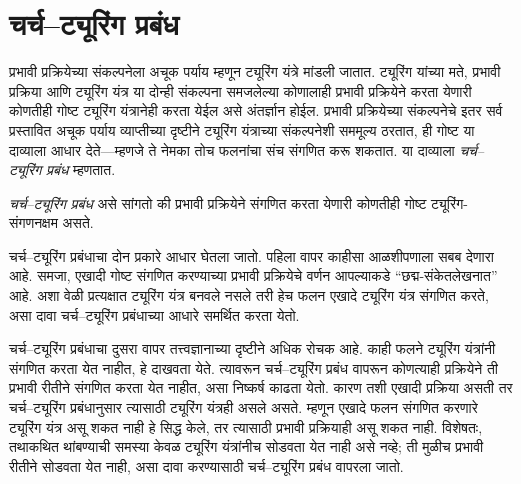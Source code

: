 \section{चर्च--ट्यूरिंग प्रबंध}\label{tur:mac:ctt:sec}

प्रभावी प्रक्रियेच्या संकल्पनेला अचूक पर्याय म्हणून ट्यूरिंग
यंत्रे मांडली जातात. ट्यूरिंग यांच्या मते, प्रभावी प्रक्रिया आणि
ट्यूरिंग यंत्र या दोन्ही संकल्पना समजलेल्या कोणालाही प्रभावी
प्रक्रियेने करता येणारी कोणतीही गोष्ट ट्यूरिंग यंत्रानेही करता
येईल असे अंतर्ज्ञान होईल. प्रभावी प्रक्रियेच्या संकल्पनेचे
इतर सर्व प्रस्तावित अचूक पर्याय व्याप्तीच्या दृष्टीने ट्यूरिंग
यंत्राच्या संकल्पनेशी सममूल्य ठरतात, ही गोष्ट या दाव्याला
आधार देते---म्हणजे ते नेमका तोच फलनांचा संच संगणित करू
शकतात. या दाव्याला \emph{चर्च--ट्यूरिंग प्रबंध} म्हणतात.

\begin{defn}[चर्च--ट्यूरिंग प्रबंध]
\emph{चर्च--ट्यूरिंग प्रबंध} असे सांगतो की प्रभावी प्रक्रियेने
संगणित करता येणारी कोणतीही गोष्ट ट्यूरिंग-संगणनक्षम असते.
\end{defn}

चर्च--ट्यूरिंग प्रबंधाचा दोन प्रकारे आधार घेतला जातो. पहिला
वापर काहीसा आळशीपणाला सबब देणारा आहे. समजा, एखादी गोष्ट
संगणित करण्याच्या प्रभावी प्रक्रियेचे वर्णन आपल्याकडे
``छद्म-संकेतलेखनात'' आहे. अशा वेळी प्रत्यक्षात ट्यूरिंग यंत्र
बनवले नसले तरी हेच फलन एखादे ट्यूरिंग यंत्र संगणित करते,
असा दावा चर्च--ट्यूरिंग प्रबंधाच्या आधारे समर्थित करता येतो.

चर्च--ट्यूरिंग प्रबंधाचा दुसरा वापर तत्त्वज्ञानाच्या दृष्टीने
अधिक रोचक आहे. काही फलने ट्यूरिंग यंत्रांनी संगणित करता
येत नाहीत, हे दाखवता येते. त्यावरून चर्च--ट्यूरिंग प्रबंध
वापरून कोणत्याही प्रक्रियेने ती प्रभावी रीतीने संगणित करता
येत नाहीत, असा निष्कर्ष काढता येतो. कारण तशी एखादी प्रक्रिया
असती तर चर्च--ट्यूरिंग प्रबंधानुसार त्यासाठी ट्यूरिंग यंत्रही
असले असते. म्हणून एखादे फलन संगणित करणारे ट्यूरिंग यंत्र
असू शकत नाही हे सिद्ध केले, तर त्यासाठी प्रभावी प्रक्रियाही
असू शकत नाही. विशेषतः, तथाकथित थांबण्याची समस्या केवळ
ट्यूरिंग यंत्रांनीच सोडवता येत नाही असे नव्हे; ती मुळीच
प्रभावी रीतीने सोडवता येत नाही, असा दावा करण्यासाठी
चर्च--ट्यूरिंग प्रबंध वापरला जातो.




